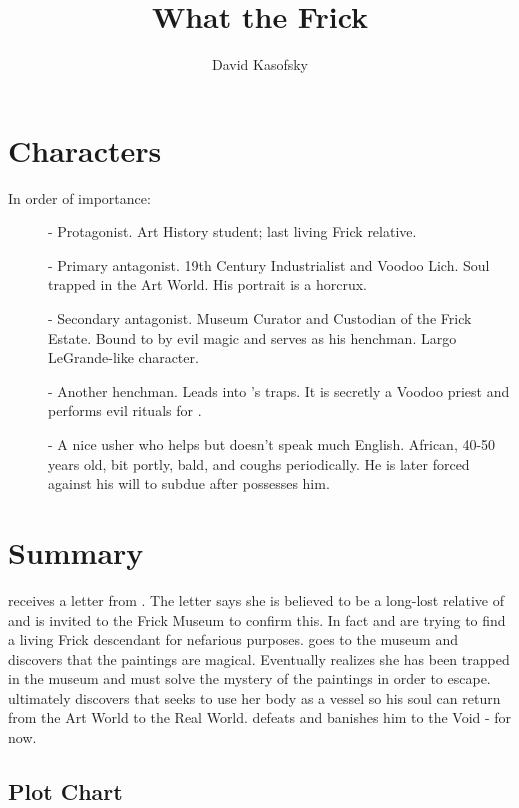 \documentclass{article}
\title{What the Frick}
\author{David Kasofsky}
\begin{document}
\tableofcontents{}
\maketitle{}

\section*{Characters}
In order of importance:
\begin{description}
  \item[\cyl{}] - Protagonist. Art History student; last living Frick relative.
  \item[\cfrick{}] - Primary antagonist. 19th Century Industrialist and Voodoo Lich. Soul trapped in the Art World. His portrait is a horcrux. 
  \item[\ccurator{}] - Secondary antagonist. Museum Curator and Custodian of the Frick Estate. Bound to \cfrick{} by evil magic and serves as his henchman. Largo LeGrande-like character.
  \item[\iaudioguide{}] - Another \cfrick{} henchman. Leads \cyl{} into \cfrick{}'s traps. It is secretly a Voodoo priest and performs evil rituals for \cfrick{}. 
  \item[\ccoughy{}] - A nice usher who helps \cyl{} but doesn't speak much English. African, 40-50 years old, bit portly, bald, and coughs periodically. He is later forced against his will to subdue \cyl{} after \iaudioguide{} possesses him.
\end{description}

\section*{Summary}
\cyl{} receives a letter from \ccurator{}. The letter says she is believed to be a long-lost relative of \cfrick{} and is invited to the Frick Museum to confirm this. In fact \ccurator{} and \cfrick{} are trying to find a living Frick descendant for nefarious purposes. \cyl{} goes to the museum and discovers that the paintings are magical. Eventually \cyl{} realizes she has been trapped in the museum and must solve the mystery of the paintings in order to escape. \cyl{} ultimately discovers that \cfrick{} seeks to use her body as a vessel so his soul can return from the Art World to the Real World. \cyl{} defeats \cfrick{} and banishes him to the Void - for now.

\subsection{Plot Chart}
\end{document}
